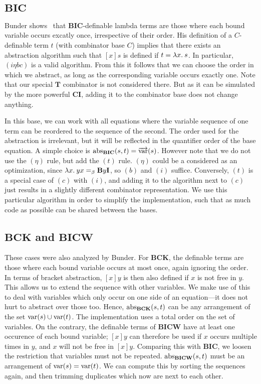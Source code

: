 \subsection*{$\mathbf{BIC}$}\label{subsec:base-bic}

Bunder shows~\cite{bunder96} that $\mathbf{BIC}$-definable lambda terms are
those where each bound variable occurs excatly once, irrespective of their order.
His definition of a $C$-definable term $t$ (with combinator base $C$)
implies that there exists an abstraction algorithm such that $[x]s$ is defined
if $t = \lambda x.\>s$.
In particular, $(i\eta bc)$ is a valid algorithm.
From this it follows that we can choose the order in which we abstract, as long
as the corresponding variable occurs exactly one.
Note that our special $\mathbf{T}$ combinator is not considered there.
But as it can be simulated by the more powerful $\mathbf{CI}$, adding it to the
combinator base does not change anything.

In this base, we can work with all equations where the variable sequence of
one term can be reordered to the sequence of the second.
The order used for the abstraction is irrelevant, but it will be reflected
in the quantifier order of the base equation.
A simple choice is $\operatorname{abs}_\mathbf{BIC}(s,t) = \overrightarrow{\operatorname{var}}(s)$.
However note that we do not use the $(\eta)$ rule, but add the $(t)$ rule.
$(\eta)$ could be a considered as an optimization, since
$\lambda x.\>yx =_\beta \mathbf{B}y\mathbf{I}$, so $(b)$ and $(i)$ suffice.
Conversely, $(t)$ is a special case of $(c)$ with $(i)$, and adding it to the
algorithm next to $(c)$ just results in a slightly different combinator
representation.
We use this particular algorithm in order to simplify the implementation,
such that as much code as possible can be shared between the bases. 

\subsection*{$\mathbf{BCK}$ and $\mathbf{BICW}$}\label{subsec:base-bck-bicw}

These cases were also analyzed by Bunder.
For $\mathbf{BCK}$, the definable terms are those where each bound variable occurs
at most once, again ignoring the order.
In terms of bracket abstraction, $[x]y$ is then also defined if $x$ is not free
in $y$.
This allows us to extend the sequence with other variables.
We make use of this to deal with variables which only occur on one side of
an equation---it does not hurt to abstract over those too.
Hence, $\operatorname{abs}_\mathbf{BCK}(s,t)$ can be any arrangement of the
set $\operatorname{var}(s) \cup \operatorname{var}(t)$.
The implementation uses a total order on the set of variables.
On the contrary, the definable terms of $\mathbf{BICW}$ have at least one
occurence of each bound variable; $[x]y$ can therefore be used if $x$ occurs
multiple times in $y$, and $x$ will not be free in $[x]y$.
Comparing this with $\mathbf{BIC}$, we loosen the restriction that variables
must not be repeated.
$\operatorname{abs}_\mathbf{BICW}(s,t)$ must be an arrangement of $\operatorname{var}(s) = \operatorname{var}(t)$.
We can compute this by sorting the sequences again, and then trimming duplicates
which now are next to each other.

